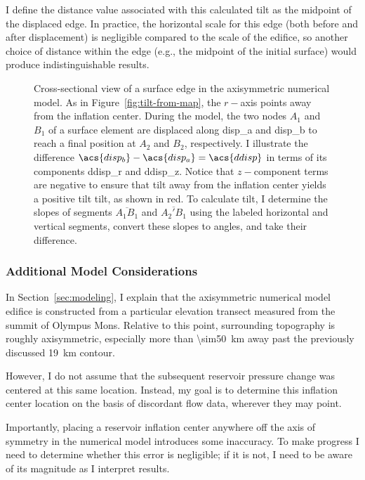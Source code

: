 I define the distance value associated with this calculated tilt as the midpoint of the displaced edge. In practice, the horizontal scale for this edge (both before and after displacement) is negligible compared to the scale of the edifice, so another choice of distance within the edge (e.g., the midpoint of the initial surface) would produce indistinguishable results.

\begin{figure}
    \caption[Tilt from numerical modeling]{Cross-sectional view of a surface edge in the axisymmetric numerical model. As in Figure~\ref{fig:tilt-from-map}, the $r-$axis points away from the inflation center. During the model, the two nodes $A_1$ and $B_1$ of a surface element are displaced along \acs{disp_a} and \acs{disp_b} to reach a final position at $A_2$ and $B_2$, respectively. I illustrate the difference $\acs{disp_b} - \acs{disp_a} = \acs{ddisp}$ in terms of its components \acs{ddisp_r} and \acs{ddisp_z}. Notice that $z-$component terms are negative to ensure that tilt away from the inflation center yields a positive tilt \acs{tilt}, as shown in red. To calculate \acs{tilt}, I determine the slopes of segments $\overline{A_1B_1}$ and $\overline{A_2'B_1}$ using the labeled horizontal and vertical segments, convert these slopes to angles, and take their difference.}%
    \label{fig:tilt-from-model}%
\end{figure}

\subsubsection{Additional Model Considerations}

In Section~\ref{sec:modeling}, I explain that the axisymmetric numerical model edifice is constructed from a particular elevation transect measured from the summit of Olympus Mons. Relative to this point, surrounding topography is roughly axisymmetric, especially more than \qty{\sim50}{\km} away past the previously discussed \qty{19}{\km} contour.

However, I do not assume that the subsequent reservoir pressure change was centered at this same location. Instead, my goal is to  determine this inflation center location on the basis of discordant flow data, wherever they may point.

Importantly, placing a reservoir inflation center anywhere off the axis of symmetry in the numerical model introduces some inaccuracy. To make progress I need to determine whether this error is negligible; if it is not, I need to be aware of its magnitude as I interpret results.

